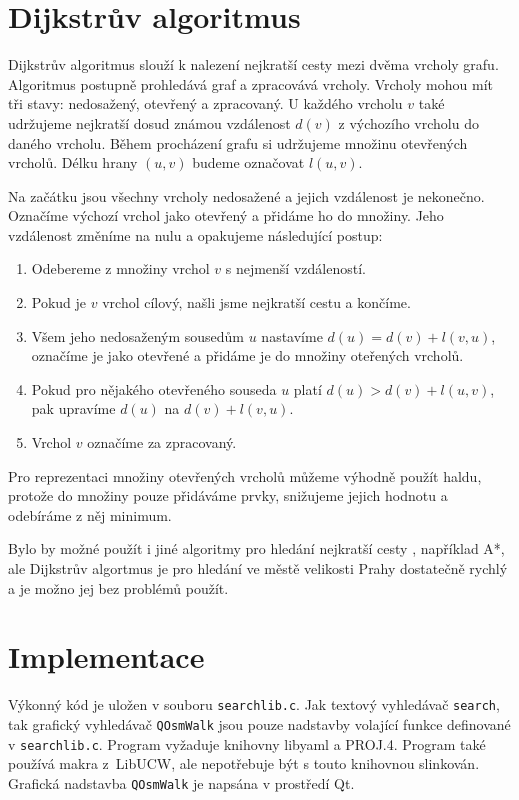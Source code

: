 \section{Dijkstrův algoritmus}
Dijkstrův algoritmus \cite{dijkstra} slouží k nalezení nejkratší cesty mezi dvěma vrcholy grafu.
Algoritmus postupně prohledává graf a zpracovává vrcholy. Vrcholy mohou mít tři
stavy: nedosažený, otevřený a zpracovaný. U každého vrcholu $v$ také udržujeme
nejkratší dosud známou vzdálenost $d(v)$ z výchozího vrcholu do daného vrcholu. 
Během procházení grafu si udržujeme množinu otevřených vrcholů. Délku hrany
$(u,v)$ budeme označovat $l(u,v)$.

Na začátku jsou všechny vrcholy nedosažené a jejich vzdálenost je nekonečno.
Označíme výchozí vrchol jako otevřený a přidáme ho do množiny. Jeho vzdálenost
změníme na nulu a opakujeme následující postup:
\begin{enumerate}
	\item Odebereme z množiny vrchol $v$ s nejmenší vzdáleností. 
	\item Pokud je $v$ vrchol cílový, našli jsme nejkratší cestu a končíme.
	\item Všem jeho nedosaženým sousedům $u$ nastavíme $d(u)=d(v)+l(v,u)$,
	označíme je jako otevřené a přidáme je do množiny oteřených vrcholů.
	\item Pokud pro nějakého otevřeného souseda $u$ platí $d(u) >
	d(v)+l(u,v)$, pak upravíme $d(u)$ na $d(v)+l(v,u)$.
	\item Vrchol $v$ označíme za zpracovaný.
\end{enumerate}
Pro reprezentaci množiny otevřených vrcholů můžeme výhodně použít haldu, protože
do množiny pouze přidáváme prvky, snižujeme jejich hodnotu a odebíráme z něj
minimum.

Bylo by možné použít i jiné algoritmy pro hledání nejkratší cesty
\cite{dijkstra}, například A*,  ale Dijkstrův
algortmus je pro hledání ve městě velikosti Prahy dostatečně rychlý a je možno
jej bez problémů použít.


\section{Implementace}
Výkonný kód je uložen v souboru \verb|searchlib.c|. Jak textový vyhledávač
\verb|search|, tak grafický vyhledávač \verb|QOsmWalk| jsou pouze nadstavby
volající funkce definované v \verb|searchlib.c|. Program vyžaduje knihovny {\tuc libyaml} a
{\tuc PROJ.4}. Program také používá makra z~{\tuc LibUCW}, ale nepotřebuje být s touto
knihovnou slinkován. Grafická nadstavba \verb|QOsmWalk| je napsána v prostředí
Qt.

